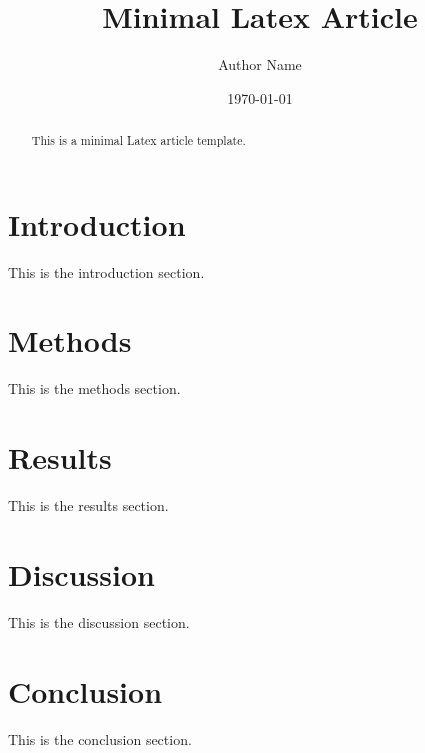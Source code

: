 \documentclass{article}
\title{Minimal Latex Article}
\author{Author Name}
\date{\today}
\begin{document}
\maketitle

\begin{abstract}
This is a minimal Latex article template.
\end{abstract}

\section{Introduction}
This is the introduction section.\cite{dummy2021}

\section{Methods}
This is the methods section.

\section{Results}
This is the results section.

\section{Discussion}
This is the discussion section.

\section{Conclusion}
This is the conclusion section.



\end{document}
